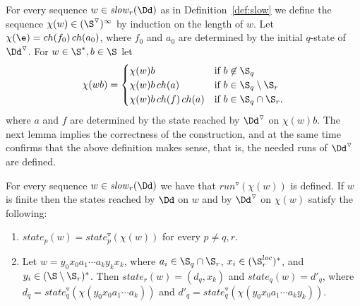\documentclass[10pt,a4paper]{article}
\newcommand{\run}{\mathit{run}}
\newcommand{\red}[1]{#1^\triangledown}
\newcommand{\slow}{\mathit{slow}}
\newcommand{\state}{\mathit{state}}
\newcommand{\ch}{\mathop{ch}}
\begin{document}
For every sequence $w\in\slow_r(\Dd)$ as in Definition~\ref{def:slow} we
define the sequence $\chi(w) \in (\red\S)^\infty$ by induction on the
length of $w$. Let $ \chi(\e)=\ch(f_0)\ch(a_0)$, where $f_0$ and $a_0$
are determined by
    the initial $q$-state of $\red\Dd$.  For $w \in \S^*, b\in \S$ let
\begin{equation*}
  \chi(wb)=
\begin{cases}
\chi(w)b & \text{if $b\not\in\S_q$}\\
\chi(w)b\ch(a) & \text{if $b\in\S_q \setminus \S_r$}\\
\chi(w)b\ch(f)\ch(a) & \text{if $b\in\S_{q}\cap\S_r$.}
\end{cases}
\end{equation*}
where $a$ and $f$ are determined by the state reached by $\red\Dd$ on
$\chi(w)b$.   The next lemma
implies the correctness of the construction, and at the same time
confirms that the above definition makes sense, that is, the needed
runs of $\red\Dd$ are defined.









\begin{lemma}\label{lemma:D invariant}
  For every sequence $w\in \slow_r(\Dd)$ we have that
  $\red\run(\chi(w))$ is defined. If $w$ is finite then the states
  reached by $\Dd$ on $w$ and by $\red\Dd$ on $\chi(w)$ satisfy the following:
  \begin{enumerate}
  \item $\state_p(w)=\red\state_p(\chi(w))$ for every
  $p\not=q,r$.
\item Let $w=y_0x_0a_1 \cdots a_ky_kx_k$, where $a_i\in \S_q \cap
  \S_r$, $x_i\in (\S^{loc}_r)^*$, and $y_i\in (\S \setminus
  \S_r)^*$. Then $\state_r(w)=(d_q,x_k)$ and $\state_q(w)=d'_q$, where
  $d_q=\red\state_q(\chi(y_0x_0a_1 \cdots a_k))$ and
  $d'_q=\red\state_q(\chi(y_0x_0a_1 \cdots a_ky_k))$.
  \end{enumerate}
\end{lemma}
\end{document}
